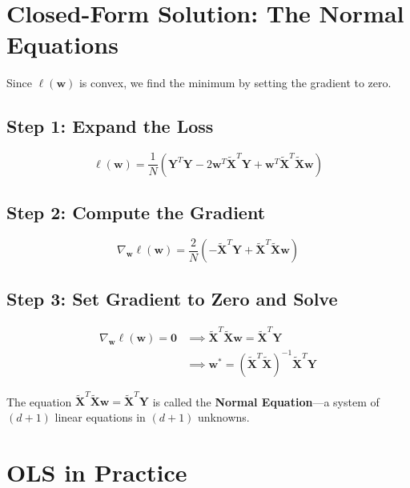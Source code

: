 \section*{Closed-Form Solution: The Normal Equations}

Since $\ell(\mathbf{w})$ is convex, we find the minimum by setting the gradient to zero.

\subsection*{Step 1: Expand the Loss}

$$\ell(\mathbf{w}) = \frac{1}{N}\!\left(\mathbf{Y}^T\mathbf{Y} - 2\mathbf{w}^T \tilde{\mathbf{X}}^T \mathbf{Y} + \mathbf{w}^T \tilde{\mathbf{X}}^T \tilde{\mathbf{X}} \mathbf{w}\right)$$

\subsection*{Step 2: Compute the Gradient}

$$\nabla_{\mathbf{w}} \ell(\mathbf{w}) = \frac{2}{N}\!\left(-\tilde{\mathbf{X}}^T \mathbf{Y} + \tilde{\mathbf{X}}^T \tilde{\mathbf{X}} \mathbf{w}\right)$$

\subsection*{Step 3: Set Gradient to Zero and Solve}

\begin{align*}
\nabla_{\mathbf{w}} \ell(\mathbf{w}) = \mathbf{0}
&\implies \tilde{\mathbf{X}}^T \tilde{\mathbf{X}} \mathbf{w} = \tilde{\mathbf{X}}^T \mathbf{Y} \\[4pt]
&\implies \boxed{\mathbf{w}^* = \left(\tilde{\mathbf{X}}^T \tilde{\mathbf{X}}\right)^{-1} \tilde{\mathbf{X}}^T \mathbf{Y}}
\end{align*}

The equation $\tilde{\mathbf{X}}^T \tilde{\mathbf{X}} \mathbf{w} = \tilde{\mathbf{X}}^T \mathbf{Y}$ is called the \textbf{Normal Equation}---a system of $(d+1)$ linear equations in $(d+1)$ unknowns.

\section*{OLS in Practice}

